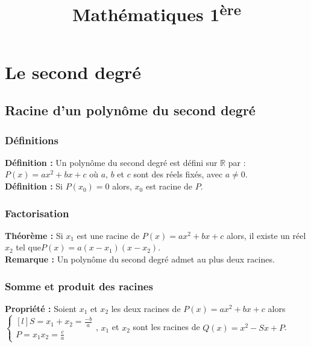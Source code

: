 \documentclass[a4paper,titlepage]{article}
\title{Mathématiques 1\textsuperscript{ère}}
\author{}
\date{}
\let\oldsection\section
\renewcommand\section{\clearpage\oldsection}
\begin{document}
\setlength{\abovedisplayskip}{0cm}
\setlength{\belowdisplayskip}{0cm}
\setlength{\abovedisplayshortskip}{0cm}
\setlength{\belowdisplayshortskip}{0cm}
\setlength{\jot}{0cm}
\maketitle
\null\newpage
\null\newpage
\tableofcontents
\null\newpage
\null\newpage
\null\newpage
\null\newpage
{}
\section{Le second degré}
    \subsection{Racine d’un polynôme du second degré}
        \subsubsection{Définitions}
            \textbf{Définition :} Un polynôme du second degré est défini sur $\mathbb{R}$ par : $P\left(x\right)=ax^{2}+bx+c$ où $a$, $b$ et $c$ sont des réels fixés, avec $a\neq0$.
            \\
            \textbf{Définition :} Si $P\left(x_{0}\right)=0$ alors, $x_{0}$ est racine de $P$.
        \subsubsection{Factorisation}
            \textbf{Théorème :} Si $x_{1}$ est une racine de $P\left(x\right)=ax^{2}+bx+c$ alors, il existe un réel $x_{2}$ tel que\linebreak$P\left(x\right)=a\left(x-x_{1}\right)\left(x-x_{2}\right)$.
            \\
            \textbf{Remarque :} Un polynôme du second degré admet au plus deux racines.
        \subsubsection{Somme et produit des racines}
        \textbf{Propriété :} Soient $x_{1}$ et $x_{2}$ les deux racines de $P\left(x\right)=ax^{2}+bx+c$ alors $\left\{\begin{smallmatrix*}[l]S=x_{1}+x_{2}=\frac{-b}{a}\\P=x_{1}x_{2}=\frac{c}{a}\end{smallmatrix*}\!\right.$, $x_{1}$ et $x_{2}$ sont les racines de $Q\left(x\right)=x^{2}-Sx+P$.
\end{document}

